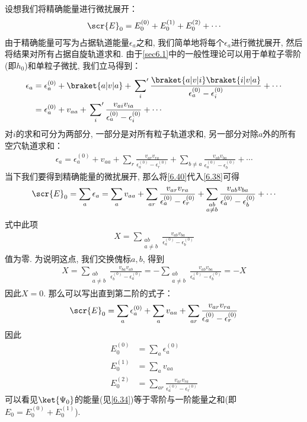 设想我们将精确能量进行微扰展开：
\begin{align*}
\scr{E}_0 = E_0^{(0)} + E_0^{(1)} + E_0^{(2)} + \cdots
\end{align*}
由于精确能量可写为占据轨道能量$\epsilon_a$之和, 
 我们简单地将每个$\epsilon_a$进行微扰展开, 
然后将结果对所有占据自旋轨道求和. 
由于\autoref{sec6.1}中的一般性理论可以用于单粒子零阶\ha (即$h_0$)和单粒子微扰, 
我们立马得到：
\begin{align}
\epsilon_a & = \epsilon_a^{(0)} + \braket{a|v|a}
    + \sideset{}{'}\sum_i\frac{\braket{a|v|i}\braket{i|v|a}}{\epsilon_a^{(0)}-\epsilon_i^{(0)}}
    + \cdots\notag\\
	       & = \epsilon_a^{(0)} + v_{aa}
    + \sideset{}{'}\sum_i\frac{v_{ai}v_{ia}}{\epsilon_a^{(0)}-\epsilon_i^{(0)}}
    + \cdots
\end{align}
对$i$的求和可分为两部分, 
一部分是对所有粒子轨道求和, 
另一部分对除$a$外的所有空穴轨道求和：
\begin{align}\label{6.40}
\epsilon_a = \epsilon_a^{(0)} + v_{aa} + \sum_r\frac{v_{ar}v_{ra}}{\epsilon_a^{(0)}-\epsilon_r^{(0)}} + \sum_{b\neq a}\frac{v_{ab}v_{ba}}{\epsilon_a^{(0)}-\epsilon_b^{(0)}} + \cdots
\end{align}
当下我们要得到精确能量的微扰展开, 
那么将\autoref{6.40}代入\autoref{6.38}可得
\begin{align}
\scr{E}_0 = \sum_a\epsilon_a = \sum_av_{aa} + \sum_{ar}\frac{v_{ar}v_{ra}}{\epsilon_a^{(0)} - \epsilon_{r}^{(0)}} + \sum_{\substack{ab\\a\neq b}}\frac{v_{ab}v_{ba}}{\epsilon_a^{(0)}- \epsilon_{b}^{(0)}} + \cdots
\end{align}
式中此项
\begin{align*}
X = \sum_{\substack{ab\\a\neq b}}\frac{v_{ab}v_{ba}}{\epsilon_a^{(0)}- \epsilon_{b}^{(0)}} 
\end{align*}
值为零. 
为说明这点, 
我们交换傀标$a,b$, 
得到
\begin{align*}
X = \sum_{\substack{ab\\a\neq b}}\frac{v_{ba}v_{ab}}{\epsilon_b^{(0)}- \epsilon_{a}^{(0)}}  = - \sum_{\substack{ab\\a\neq b}}\frac{v_{ab}v_{ba}}{\epsilon_a^{(0)}- \epsilon_{b}^{(0)}} = -X 
\end{align*}
因此$X=0$. 
那么可以写出直到第二阶的式子：
\begin{align}
\scr{E}_0 = \sum_a\epsilon_a^{(0)} + \sum_av_{aa} + \sum_{ar}\frac{v_{ar}v_{ra}}{\epsilon_a^{(0)} - \epsilon_{r}^{(0)}}
\end{align}
因此
\begin{subequations}\label{6.43}
\begin{align}
E_0^{(0)} & = \sum_a\epsilon_a^{(0)}\\
E_0^{(1)} & = \sum_av_{aa} \label{6.43b}\\
E_0^{(2)} & = \sum_{ar}\frac{v_{ar}v_{ra}}{\epsilon_a^{(0)} - \epsilon_r^{(0)}}
\label{6.43c}
\end{align}
\end{subequations}
可以看见$\ket{\Psi_0}$的能量(见\autoref{6.34})等于零阶与一阶能量之和(即$E_0 = E_0^{(0)}+E_0^{(1)}$).


